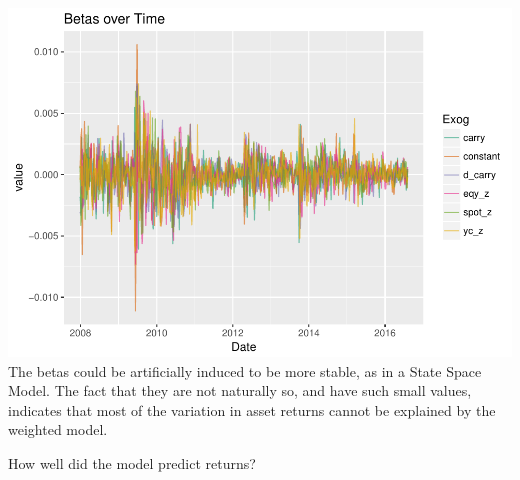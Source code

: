 \documentclass[]{article}
\begin{document}
\includegraphics{Econometric_FX_Forecasting_files/figure-latex/unnamed-chunk-4-1.pdf}
The betas could be artificially induced to be more stable, as in a State
Space Model. The fact that they are not naturally so, and have such
small values, indicates that most of the variation in asset returns
cannot be explained by the weighted model.

How well did the model predict returns?
\end{document}
